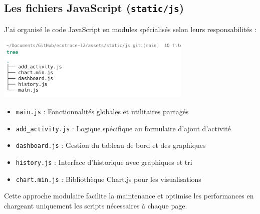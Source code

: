 \documentclass[a4paper,11pt]{article}
\begin{document}
            \subsection{Les fichiers JavaScript (\texttt{static/js})}
                \noindent J'ai organisé le code JavaScript en modules spécialisés selon leurs responsabilités :

                \begin{center}
                    \includegraphics[width=0.7\textwidth]{captures/templates_et_static/static/js/img1.png}
                \end{center}

                \begin{itemize}
                    \item \texttt{main.js} : Fonctionnalités globales et utilitaires partagés
                    \item \texttt{add\_activity.js} : Logique spécifique au formulaire d'ajout d'activité
                    \item \texttt{dashboard.js} : Gestion du tableau de bord et des graphiques
                    \item \texttt{history.js} : Interface d'historique avec graphiques et tri
                    \item \texttt{chart.min.js} : Bibliothèque Chart.js pour les visualisations
                \end{itemize}

                \noindent Cette approche modulaire facilite la maintenance et optimise les performances en chargeant uniquement les scripts nécessaires à chaque page.
\end{document}
